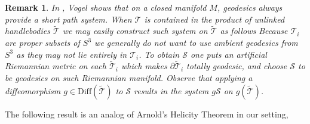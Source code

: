 \documentclass[12pt]{article}
\numberwithin{equation}{section}
\newtheorem{rem}[theorem]{Remark}
\newenvironment{remark}{\begin{rem} \rm}{\end{rem}}
\newcommand{\no}{\noindent}
\begin{document}
\begin{remark}
In \cite{Vogel03}, Vogel shows that on a closed manifold $M$, geodesics always provide a short path system. When $\mathcal{T}$ is contained in the product of unlinked handlebodies $\widetilde{\mathcal{T}}$
we may easily construct such system on $\widetilde{\mathcal{T}}$ as follows
 Because  $\mathcal{\mathcal{T}}_i$ are proper subsets of $S^3$ we generally do not want to use ambient geodesics from $S^3$ as they may not lie entirely 
in $\mathcal{T}_i$. To obtain $\mathcal{S}$ one puts an artificial Riemannian metric 
on each $\widetilde{\mathcal{T}}_i$ which makes $\partial\widetilde{\mathcal{T}}_i$ totally geodesic, and choose $\mathcal{S}$ to be geodesics on such Riemannian manifold. Observe that applying a diffeomorphism $g\in \text{Diff}(\widetilde{\mathcal{T}})$ to $\mathcal{S}$ 
results in the system $g\mathcal{S}$ on $g(\widetilde{\mathcal{T}})$.
\end{remark}

\no The following result is an analog of Arnold's Helicity Theorem in our setting,
\end{document}
